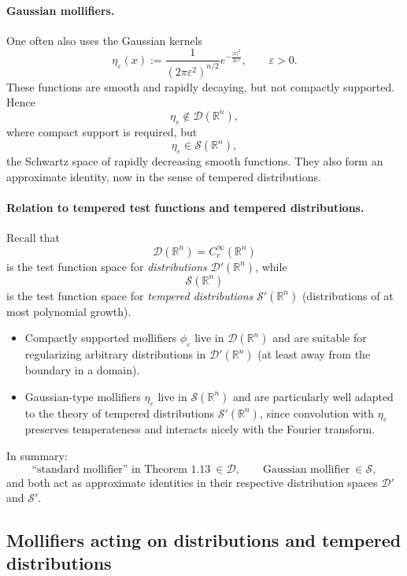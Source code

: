 \documentclass[12pt,a4paper]{article}
\theoremstyle{plain}
\theoremstyle{definition}
\theoremstyle{remark}
\theoremstyle{remark}
\begin{document}
\paragraph{Gaussian mollifiers.}
One often also uses the Gaussian kernels
\[
\eta_\varepsilon(x)
:= \frac{1}{(2\pi\varepsilon^2)^{n/2}}
e^{-\frac{|x|^2}{2\varepsilon^2}},\qquad \varepsilon>0.
\]
These functions are smooth and rapidly decaying, but not compactly
supported. Hence
\[
\eta_\varepsilon \notin \mathcal{D}(\mathbb{R}^n),
\]
where compact support is required, but
\[
\eta_\varepsilon \in \mathcal{S}(\mathbb{R}^n),
\]
the Schwartz space of rapidly decreasing smooth functions.  They also
form an approximate identity, now in the sense of tempered
distributions.

\paragraph{Relation to tempered test functions and tempered distributions.}
Recall that
\[
\mathcal{D}(\mathbb{R}^n) = C_c^\infty(\mathbb{R}^n)
\]
is the test function space for \emph{distributions}
$\mathcal{D}'(\mathbb{R}^n)$, while
\[
\mathcal{S}(\mathbb{R}^n)
\]
is the test function space for \emph{tempered distributions}
$\mathcal{S}'(\mathbb{R}^n)$ (distributions of at most polynomial
growth).

\begin{itemize}
	\item Compactly supported mollifiers $\phi_\varepsilon$ live in
	$\mathcal{D}(\mathbb{R}^n)$ and are suitable for regularizing
	arbitrary distributions in $\mathcal{D}'(\mathbb{R}^n)$ (at least
	away from the boundary in a domain).
	
	\item Gaussian-type mollifiers $\eta_\varepsilon$ live in
	$\mathcal{S}(\mathbb{R}^n)$ and are particularly well adapted to
	the theory of tempered distributions $\mathcal{S}'(\mathbb{R}^n)$,
	since convolution with $\eta_\varepsilon$ preserves temperateness
	and interacts nicely with the Fourier transform.
\end{itemize}

In summary:
\[
\text{``standard mollifier'' in Theorem~1.13} \ \in \mathcal{D},
\qquad
\text{Gaussian mollifier} \ \in \mathcal{S},
\]
and both act as approximate identities in their respective distribution
spaces $\mathcal{D}'$ and $\mathcal{S}'$.

\subsection*{Mollifiers acting on distributions and tempered distributions}
\end{document}
